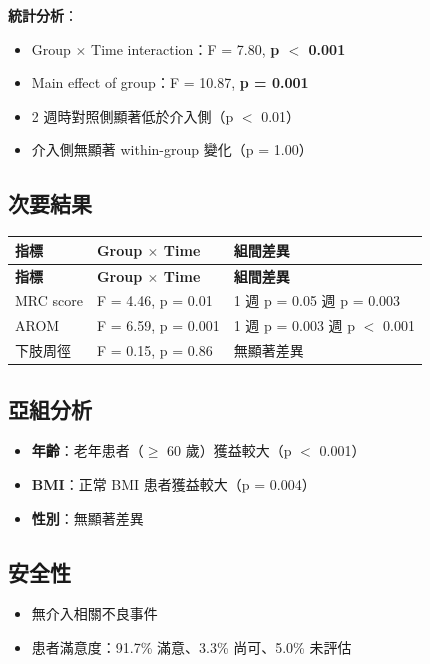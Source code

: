 \documentclass[11pt,a4paper]{article}
\begin{document}
\textbf{統計分析}：
\begin{itemize}
    \item Group $\times$ Time interaction：F = 7.80, \textbf{p $<$ 0.001}
    \item Main effect of group：F = 10.87, \textbf{p = 0.001}
    \item 2 週時對照側顯著低於介入側（p $<$ 0.01）
    \item 介入側無顯著 within-group 變化（p = 1.00）
\end{itemize}

\subsection{次要結果}

\begin{longtable}{p{4cm}p{5cm}p{5cm}}
\toprule
\textbf{指標} & \textbf{Group $\times$ Time} & \textbf{組間差異} \\
\midrule
\endfirsthead
\toprule
\textbf{指標} & \textbf{Group $\times$ Time} & \textbf{組間差異} \\
\midrule
\endhead
MRC score & F = 4.46, p = 0.01 & 1 週 p = 0.05\newline 2 週 p = 0.003 \\
\midrule
AROM & F = 6.59, p = 0.001 & 1 週 p = 0.003\newline 2 週 p $<$ 0.001 \\
\midrule
下肢周徑 & F = 0.15, p = 0.86 & 無顯著差異 \\
\bottomrule
\end{longtable}

\subsection{亞組分析}

\begin{itemize}
    \item \textbf{年齡}：老年患者（$\geq$ 60 歲）獲益較大（p $<$ 0.001）
    \item \textbf{BMI}：正常 BMI 患者獲益較大（p = 0.004）
    \item \textbf{性別}：無顯著差異
\end{itemize}

\subsection{安全性}

\begin{itemize}
    \item 無介入相關不良事件
    \item 患者滿意度：91.7\% 滿意、3.3\% 尚可、5.0\% 未評估
\end{itemize}
\end{document}
